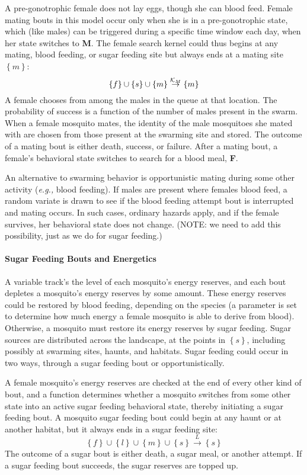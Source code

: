 \documentclass{article}
\newcommand{\eg}{{\em e.g., }}
\begin{document}
A pre-gonotrophic female does not lay eggs, though she can blood
feed. Female mating bouts in this model occur only when she is in
a pre-gonotrophic state, which (like males) can be triggered
during a specific time window each day, when her state switches
to {\bf M}. The female search kernel could thus begins at any
mating, blood feeding, or sugar feeding site but always ends at a
mating site $\left\{ m\right\} $:
%
\begin{equation}
%
\left\{ f\right\} \cup \left\{ s\right\} \cup \left\{ m\right\}
\overset{{\cal K}_M}{\rightarrow} \left\{ m\right\}
%
\end{equation}
%
A female chooses from among the males in the queue at that
location. The probability of success is a function of the number
of males present in the swarm. When a female mosquito mates, the
identity of the male mosquitoes she mated with are chosen from
those present at the swarming site and stored. The outcome of a
mating bout is either death, success, or failure. After a mating
bout, a female's behavioral state switches to search for a blood
meal, {\bf F}.

An alternative to swarming behavior is opportunistic mating
during some other activity (\eg blood feeding). If males are
present where females blood feed, a random variate is drawn to
see if the blood feeding attempt bout is interrupted and mating
occurs. In such cases, ordinary hazards apply, and if the female
survives, her behavioral state does not change. (NOTE: we need to
add this possibility, just as we do for sugar feeding.)

\paragraph{Sugar Feeding Bouts and Energetics}

A variable track's the level of each mosquito's energy reserves,
and each bout depletes a mosquito's energy reserves by some
amount. These energy reserves could be restored by blood feeding,
depending on the species (a parameter is set to determine how
much energy a female mosquito is able to derive from blood).
Otherwise, a mosquito must restore its energy reserves by sugar
feeding. Sugar sources are distributed across the landscape, at
the points in $\left\{ s\right\} $, including possibly at
swarming sites, haunts, and habitats. Sugar feeding could occur
in two ways, through a sugar feeding bout or opportunistically.

A female mosquito's energy reserves are checked at the end of
every other kind of bout, and a function determines whether a
mosquito switches from some other state into an active sugar
feeding behavioral state, thereby initiating a sugar feeding
bout. A mosquito sugar feeding bout could begin at any haunt or
at another habitat, but it always ends in a sugar feeding site:
%
\begin{equation}
%
\left\{ f\right\} \cup \left\{ l\right\}  \cup \left\{ m\right\}
\cup \left\{ s\right\}  \overset{L}{\rightarrow} \left\{
s\right\}
%
\end{equation}
%
The outcome of a sugar bout is either death, a sugar meal, or
another attempt. If a sugar feeding bout succeeds, the sugar
reserves are topped up.
\end{document}
